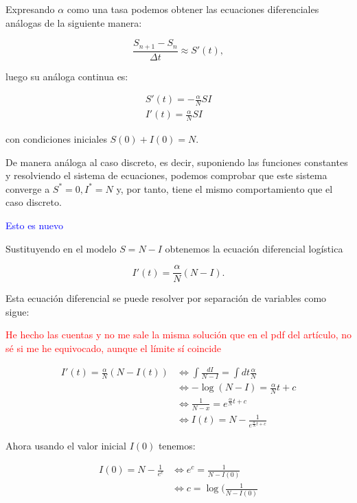 Expresando $\alpha$ como una tasa podemos obtener las ecuaciones diferenciales análogas de la siguiente manera:

$$\frac{S_{n+1} - S_n}{\Delta t} \approx S'(t),$$

luego su análoga continua es:

\begin{equation}
\begin{aligned}
S'(t) = -\frac{\alpha}{N}SI \\
I'(t) = \frac{\alpha}{N}SI
\end{aligned}
\end{equation}

con condiciones iniciales $S(0)+I(0)=N$.

De manera análoga al caso discreto, es decir, suponiendo las funciones constantes y resolviendo el sistema de ecuaciones, podemos comprobar que este sistema converge a $S^*=0, I^*=N$ y, por tanto, tiene el mismo comportamiento que el caso discreto.

\textcolor{blue}{Esto es nuevo}

Sustituyendo en el modelo $S=N-I$ obtenemos la ecuación diferencial logística

$$I'(t) = \frac{\alpha}{N}(N-I).$$

Esta ecuación diferencial se puede resolver por separación de variables como sigue:

\textcolor{red}{He hecho las cuentas y no me sale la misma solución que en el pdf del artículo, no sé si me he equivocado, aunque el límite sí coincide}

\begin{equation}
\begin{aligned}
I'(t)=\frac{\alpha}{N}(N-I(t)) & \Leftrightarrow \int \frac{dI}{N-I} = \int dt \frac{\alpha}{N} \\
& \Leftrightarrow -\log(N-I) = \frac{\alpha}{N}t+c \\
& \Leftrightarrow  \frac{1}{N-x} = e^{\frac{\alpha}{N}t+c} \\
& \Leftrightarrow  I(t) = N-\frac{1}{e^{\frac{\alpha}{N}t+c}}
\end{aligned}
\end{equation}

Ahora usando el valor inicial $I(0)$ tenemos:

\begin{equation}
\begin{aligned}
I(0) = N-\frac{1}{e^c} & \Leftrightarrow e^c = \frac{1}{N-I(0)} \\
& \Leftrightarrow c=\log(\frac{1}{N-I(0)}
\end {aligned}
\end{equation}

